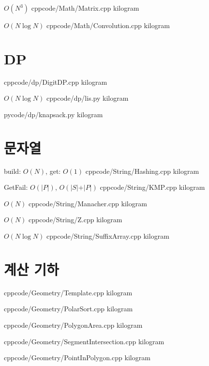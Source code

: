 \documentclass[landscape, 8pt, a4paper, twocolumn]{extarticle} %
\begin{document}
{}{$O(N^3)$}
{cpp}{code/Math/Matrix.cpp}
{kilogram}

{}{$O(N \log N)$}
{cpp}{code/Math/Convolution.cpp}
{kilogram}

\section{DP}

{}{}
{cpp}{code/dp/DigitDP.cpp}
{kilogram}

{}{$O(N\log N)$}
{cpp}{code/dp/lis.py}
{kilogram}

{}{}
{py}{code/dp/knapsack.py}
{kilogram}

\section{문자열}

{}{build: $O(N)$, get: $O(1)$}
{cpp}{code/String/Hashing.cpp}
{kilogram}

{}{GetFail: $O(\vert P\vert)$, $O(\vert S\vert + \vert P\vert)$}
{cpp}{code/String/KMP.cpp}
{kilogram}

{}{$O(N)$}
{cpp}{code/String/Manacher.cpp}
{kilogram}

{}{$O(N)$}
{cpp}{code/String/Z.cpp}
{kilogram}

{}{$O(N \log N)$}
{cpp}{code/String/SuffixArray.cpp}
{kilogram}

\section{계산 기하}

{}{}
{cpp}{code/Geometry/Template.cpp}
{kilogram}

{}{}
{cpp}{code/Geometry/PolarSort.cpp}
{kilogram}

{}{}
{cpp}{code/Geometry/PolygonArea.cpp}
{kilogram}

{}{}
{cpp}{code/Geometry/SegmentIntersection.cpp}
{kilogram}

{}{}
{cpp}{code/Geometry/PointInPolygon.cpp}
{kilogram}
\end{document}
